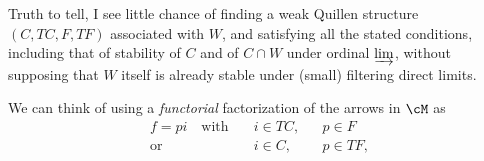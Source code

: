 Truth to tell, I see little chance of finding a weak Quillen structure $(C,TC,F,TF)$ associated with $W$, and satisfying all the stated conditions, including that of stability of $C$ and of $C\cap W$ under ordinal $\varinjlim$, without supposing that $W$ itself is already stable under (small) filtering direct limits. %

We can think of using a \textit{functorial} factorization of the arrows in $\cM$ as
\[
\begin{aligned}
f = pi \quad \text{with}\quad & i\in TC, && p\in F\\
\text{or}\quad & i\in C, && p\in TF,
\end{aligned}
\]